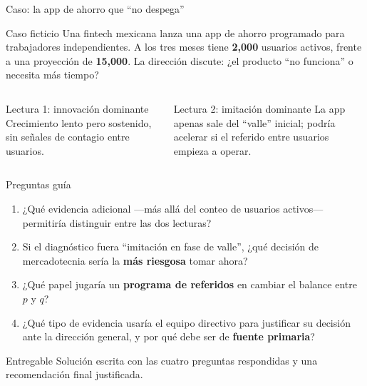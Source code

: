 \documentclass[aspectratio=169,xcolor=dvipsnames]{beamer}
\begin{document}
\begin{frame}{Caso: la app de ahorro que \enquote{no despega}}
\begin{exampleblock}{Caso ficticio}
  Una fintech mexicana lanza una app de ahorro programado para trabajadores independientes. A los tres meses tiene \textbf{2{,}000} usuarios activos, frente a una proyección de \textbf{15{,}000}. La dirección discute: ¿el producto \enquote{no funciona} o necesita más tiempo?
\end{exampleblock}
\begin{columns}[T]
  \begin{block}{Lectura 1: innovación dominante}
    \small Crecimiento lento pero sostenido, sin señales de contagio entre usuarios.
  \end{block}
  \begin{block}{Lectura 2: imitación dominante}
    \small La app apenas sale del \enquote{valle} inicial; podría acelerar si el referido entre usuarios empieza a operar.
  \end{block}
\end{columns}
\end{frame}

\begin{frame}{Preguntas guía}
\begin{enumerate}
  \item ¿Qué evidencia adicional —más allá del conteo de usuarios activos— permitiría distinguir entre las dos lecturas?
  \vspace{3pt}
  \item Si el diagnóstico fuera \enquote{imitación en fase de valle}, ¿qué decisión de mercadotecnia sería la \textbf{más riesgosa} tomar ahora?
  \vspace{3pt}
  \item ¿Qué papel jugaría un \textbf{programa de referidos} en cambiar el balance entre $p$ y $q$?
  \vspace{3pt}
  \item ¿Qué tipo de evidencia usaría el equipo directivo para justificar su decisión ante la dirección general, y por qué debe ser de \textbf{fuente primaria}?
\end{enumerate}
\vspace{6pt}
\begin{alertblock}{Entregable}
  \small Solución escrita con las cuatro preguntas respondidas y una recomendación final justificada.
\end{alertblock}
\end{frame}
\end{document}

